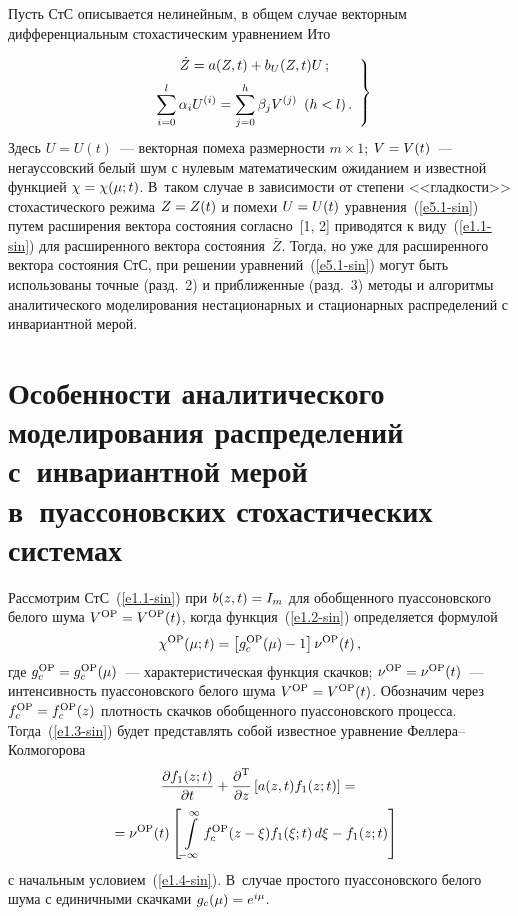 \begin{multicols}{2}
\vspace*{-2pt}

Пусть  СтС описывается нелинейным, в общем случае векторным дифференциальным 
стохастическим уравнением Ито~\cite{1-sin, 2-sin, 15-sin, 18-sin}

\noindent
\begin{equation}
\left.
\begin{array}{c}
    \dot Z = a(Z,t) + b_U(Z,t) U\,;\\[6pt] 
\displaystyle    \sum\limits_{i=0}^l \alpha_i U^{(i)} =
\displaystyle\sum\limits_{j=0}^h \beta_j V^{(j)}\enskip (h<l)\,.
\end{array}
\right\}
    \label{e5.1-sin}
    \end{equation}
    Здесь $U=U(t)$~--- векторная помеха размерности  $m\times 1$; $V\hm=V(t)$~--- 
    негауссовский белый шум с нулевым математическим ожиданием и известной функцией  
    $\chi\hm=\chi(\mu;t)$. В~таком случае в за\-ви\-си\-мости от степени <<гладкости>> 
    стохастического режима $Z\hm=Z(t)$ и помехи $U\hm=U(t)$ уравнения~(\ref{e5.1-sin})  
    путем расширения вектора состояния согласно~[1, 2] приводятся к виду~(\ref{e1.1-sin}) 
    для расширенного вектора состояния~$\bar Z$. Тогда, но уже для расширенного вектора 
    состояния СтС, при решении уравнений~(\ref{e5.1-sin}) могут быть использованы точные 
    (разд.~2) и приближенные (разд.~3) методы и алгоритмы аналитического моделирования 
    нестационарных и стационарных распределений с инвариантной мерой.

\section{Особенности аналитического моделирования распределений с~инвариантной мерой 
в~пуассоновских стохастических системах}

Рассмотрим СтС~(\ref{e1.1-sin}) при $b(z,t) \hm=I_m$ для обобщенного пуассоновского 
белого шума  $V^{\mathrm{OP}}\hm=  V^{\mathrm{OP}}(t)$, когда функция~(\ref{e1.2-sin}) 
определяется формулой
\begin{equation*}
\chi^{\mathrm{OP}} (\mu;t) =\lk g_c^{\mathrm{OP}} (\mu) -
1\rk \nu^{\mathrm{OP}} (t)\,, %
\end{equation*}
где $g_c^{\mathrm{OP}} \hm=g_c^{\mathrm{OP}} (\mu)$~--- характеристическая 
функция скачков; $\nu^{\mathrm{OP}} \hm= \nu^{\mathrm{OP}} (t)$~--- 
интенсивность пуассоновского белого шума 
$V^{\mathrm{OP}}\hm=V^{\mathrm{OP}} (t)$. Обозначим через $f_c^{\mathrm{OP}} \hm=
 f_c^{\mathrm{OP}} (z)$ плотность скачков обобщенного пуассоновского процесса. 
 Тогда~(\ref{e1.3-sin}) будет представлять собой известное уравнение Фел\-ле\-ра--Кол\-мо\-го\-ро\-ва
\begin{multline}
\fr{\prt f_1(z;t)}{\prt t} + \fr{\prt^{\mathrm{T}}}{\prt z} 
    \lk a(z,t) f_1(z;t)\rk ={}\\
    \hspace*{-3mm}{}= \nu^{\mathrm{OP}} (t) \lk \iin f_c^{\mathrm{OP}} (z-\xi) f_1 (\xi;t)\, d\xi - f_1(z;t)\rk
    \label{e6.2-sin}
    \end{multline}
с начальным условием~(\ref{e1.4-sin}). В~случае простого пуассоновского белого шума 
с единичными скачками $g_c (\mu) \hm= e^{i\mu}$.


\end{multicols}
